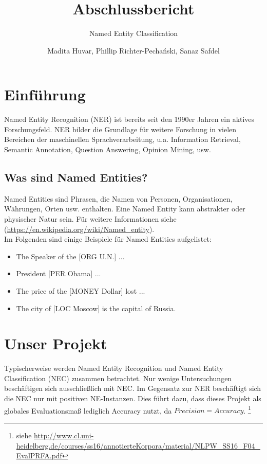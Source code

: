 \documentclass[bibliography=totoc]{scrartcl}
\begin{document}
		\title{\vspace{-2cm}Abschlussbericht}
		\subtitle{Named Entity Classification}
		\author{Madita Huvar, Phillip Richter-Pechański, Sanaz Safdel} 
		
		\maketitle
		
		\newpage
		
		\tableofcontents
		
		\newpage
		
\section{Einführung}
	Named Entity Recognition (NER) ist bereits seit den 1990er Jahren ein aktives Forschungsfeld.\cite{Borthwick99}\cite{Tjong2003}\cite{Marrero2013}
	NER bilder die Grundlage für weitere Forschung in vielen Bereichen der maschinellen Sprachverarbeitung, u.a. Information Retrieval, Semantic Annotation, Question Answering, Opinion Mining, usw.\cite{Marrero2013}
	\subsection{Was sind Named Entities?}
		Named Entities sind Phrasen, die Namen von Personen, Organisationen,
		Währungen, Orten usw. enthalten. Eine Named Entity kann abstrakter oder physischer Natur sein. Für weitere Informationen siehe (\url{https://en.wikipedia.org/wiki/Named_entity}).\\
		Im Folgenden sind einige Beispiele für Named Entities aufgelistet:
		\begin{itemize}
			\item The Speaker of the [ORG U.N.] ...
			\item President [PER Obama] ...
			\item The price of the [MONEY Dollar] lost ...
			\item The city of [LOC Moscow] is the capital of Russia.
		\end{itemize}

\section{Unser Projekt}
	Typischerweise werden Named Entity Recognition und Named Entity
	Classification (NEC) zusammen betrachtet. Nur wenige Untersuchungen beschäftigen sich ausschließlich mit NEC.\cite{Primadhanty2014}\cite{He2016} Im Gegensatz zur NER beschäftigt sich die NEC nur mit positiven NE-Instanzen. Dies führt dazu, dass dieses Projekt als globales Evaluationsmaß lediglich Accuracy nutzt, da $Precision=Accuracy$. \footnote{siehe \url{http://www.cl.uni-heidelberg.de/courses/ss16/annotierteKorpora/material/NLPW_SS16_F04_EvalPRFA.pdf}}
\end{document}
